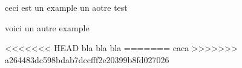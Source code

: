 \beguindocument
ceci est un example
un aotre test

voici un autre example

<<<<<<< HEAD
bla bla bla
=======
caca
>>>>>>> a264483dc598bdab7dccfff2e20399b8fd027026
